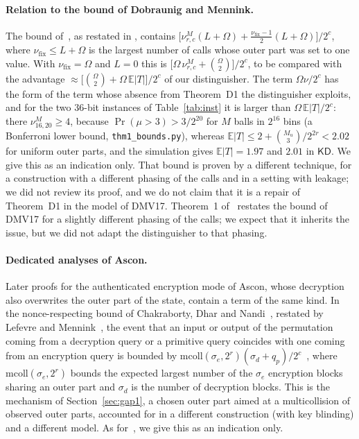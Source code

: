 \documentclass[11pt,a4paper]{article}
\theoremstyle{definition}
\theoremstyle{remark}
\newcommand{\KD}{\mathsf{KD}}
\newcommand{\E}{\mathbb{E}}
\newcommand{\file}[1]{\texttt{#1}}
\begin{document}
\paragraph{Relation to the bound of Dobraunig and Mennink.}
The bound of~\cite{DM19}, as restated in \cite[Theorem~2]{Men23}, contains
$\bigl[\nu^M_{r,c}(L+\Omega) + \tfrac{\nu_{\mathrm{fix}}-1}{2}(L+\Omega)\bigr]/2^c$, where $\nu_{\mathrm{fix}} \le L + \Omega$ is the largest number of calls whose
outer part was set to one value. With $\nu_{\mathrm{fix}} = \Omega$ and $L = 0$ this is $\bigl[\Omega\,\nu^M_{r,c} + \binom{\Omega}{2}\bigr]/2^c$, to be
compared with the advantage $\approx \bigl[\binom{\Omega}{2} + \Omega\,\E|T|\bigr]/2^c$ of our distinguisher. The term $\Omega\nu/2^c$ has the form of the term
whose absence from Theorem~D1 the distinguisher exploits, and for the two $36$-bit instances of Table~\ref{tab:inst} it is larger than
$\Omega\,\E|T|/2^c$: there $\nu^M_{16,20} \ge 4$, because $\Pr(\mu > 3) > 3/2^{20}$ for $M$ balls in $2^{16}$ bins (a Bonferroni lower
bound, \file{thm1\_bounds.py}), whereas $\E|T| \le 2 + \binom{M_u}{3}/2^{2r} < 2.02$ for uniform outer parts, and the simulation
gives $\E|T| = 1.97$ and $2.01$ in $\KD$. We give this as an indication only. That bound is
proven by a different technique, for a construction with a different phasing of the calls and in a setting with
leakage; we did not review its proof, and we do not claim that it is a repair of Theorem~D1 in the model of DMV17.
Theorem~1 of~\cite{Men23} restates the bound of DMV17 for a slightly different phasing of the calls; we expect that it
inherits the issue, but we did not adapt the distinguisher to that phasing.

\paragraph{Dedicated analyses of Ascon.}
Later proofs for the authenticated encryption mode of Ascon, whose decryption also overwrites the outer part of the
state, contain a term of the same kind. In the nonce-respecting bound of Chakraborty, Dhar and
Nandi~\cite[Theorem~2]{CDN23}, restated by Lefevre and Mennink~\cite[Theorem~1]{LM25}, the event that an input or
output of the permutation coming from a decryption query or a primitive query coincides with one coming from an
encryption query is bounded by $\mathrm{mcoll}(\sigma_e, 2^r)(\sigma_d + q_p)/2^c$~\cite[Lemma~6]{CDN23}, where
$\mathrm{mcoll}(\sigma_e, 2^r)$ bounds the expected largest number of the $\sigma_e$ encryption blocks sharing an outer part
and $\sigma_d$ is the number of decryption blocks. This is the mechanism of Section~\ref{sec:gap1}, a chosen outer part
aimed at a multicollision of observed outer parts, accounted for in a different construction (with key blinding) and
a different model. As for~\cite{DM19}, we give this as an indication only.
\end{document}
